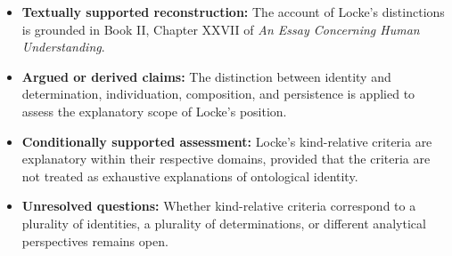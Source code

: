 \begin{itemize}
    \item \textbf{Textually supported reconstruction:}
    The account of Locke's distinctions is
    grounded in Book II, Chapter XXVII of
    \textit{An Essay Concerning Human Understanding}.

    \item \textbf{Argued or derived claims:}
    The distinction between identity and
    determination, individuation, composition,
    and persistence is applied to assess the
    explanatory scope of Locke's position.

    \item \textbf{Conditionally supported assessment:}
    Locke's kind-relative criteria are
    explanatory within their respective
    domains, provided that the criteria are
    not treated as exhaustive explanations
    of ontological identity.

    \item \textbf{Unresolved questions:}
    Whether kind-relative criteria correspond
    to a plurality of identities, a plurality
    of determinations, or different analytical
    perspectives remains open.
\end{itemize}


